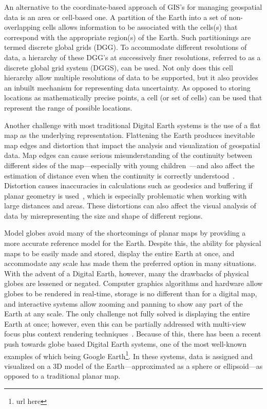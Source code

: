 An alternative to the coordinate-based approach of GIS's for managing geospatial data is an area or cell-based one.
A partition of the Earth into a set of non-overlapping cells allows information to be associated with the cells(s) that correspond with the appropriate region(s) of the Earth.
Such partitionings are termed discrete global grids (DGG).
To accommodate different resolutions of data, a hierarchy of these DGG's at successively finer resolutions, referred to as a discrete global grid system (DGGS), can be used.
Not only does this cell hierarchy allow multiple resolutions of data to be supported, but it also provides an inbuilt mechanism for representing data uncertainty.
As opposed to storing locations as mathematically precise points, a cell (or set of cells) can be used that represent the range of possible locations.


Another challenge with most traditional Digital Earth systems is the use of a flat map as the underlying representation.
Flattening the Earth produces inevitable map edges and distortion that impact the analysis and visualization of geospatial data.
Map edges can cause serious misunderstanding of the continuity between different sides of the map---especially with young children~\cite{hennerdal2015beyond}---and also affect the estimation of distance even when the continuity is correctly understood~\cite{hruby20182000}.
Distortion causes inaccuracies in calculations such as geodesics and buffering if planar geometry is used~\cite{flaterbuffering}, which is especially problematic when working with large distances and areas.
These distortions can also affect the visual analysis of data by misrepresenting the size and shape of different regions.


Model globes avoid many of the shortcomings of planar maps by providing a more accurate reference model for the Earth.
Despite this, the ability for physical maps to be easily made and stored, display the entire Earth at once, and accommodate any scale has made them the preferred option in many situations.
With the advent of a Digital Earth, however, many the drawbacks of physical globes are lessened or negated.
Computer graphics algorithms and hardware allow globes to be rendered in real-time, storage is no different than for a digital map, and interactive systems allow zooming and panning to show any part of the Earth at any scale.
The only challenge not fully solved is displaying the entire Earth at once; however, even this can be partially addressed with multi-view focus plus context rendering techniques~\cite{mark-sherlock}.
Because of this, there has been a recent push towards globe based Digital Earth systems, one of the most well-known examples of which being Google Earth\footnote{url here}.
In these systems, data is assigned and visualized on a 3D model of the Earth---approximated as a sphere or ellipsoid---as opposed to a traditional planar map.

